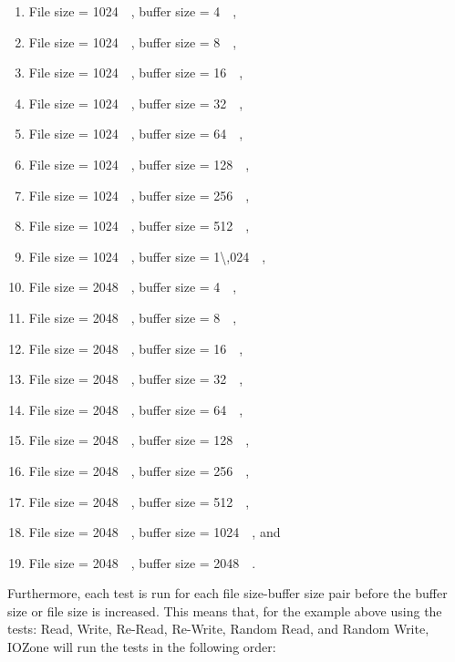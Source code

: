 \begin{enumerate}
	\item File size = \SI{1024}{\kilo\byte}, buffer size = \SI{4}{\kilo\byte},
	\item File size = \SI{1024}{\kilo\byte}, buffer size = \SI{8}{\kilo\byte},
	\item File size = \SI{1024}{\kilo\byte}, buffer size = \SI{16}{\kilo\byte},
	\item File size = \SI{1024}{\kilo\byte}, buffer size = \SI{32}{\kilo\byte},
	\item File size = \SI{1024}{\kilo\byte}, buffer size = \SI{64}{\kilo\byte},
	\item File size = \SI{1024}{\kilo\byte}, buffer size = \SI{128}{\kilo\byte},
	\item File size = \SI{1024}{\kilo\byte}, buffer size = \SI{256}{\kilo\byte},
	\item File size = \SI{1024}{\kilo\byte}, buffer size = \SI{512}{\kilo\byte},
	\item File size = \SI{1024}{\kilo\byte}, buffer size = \SI{1\,024}{\kilo\byte},
	\item File size = \SI{2048}{\kilo\byte}, buffer size = \SI{4}{\kilo\byte},
	\item File size = \SI{2048}{\kilo\byte}, buffer size = \SI{8}{\kilo\byte},
	\item File size = \SI{2048}{\kilo\byte}, buffer size = \SI{16}{\kilo\byte},
	\item File size = \SI{2048}{\kilo\byte}, buffer size = \SI{32}{\kilo\byte},
	\item File size = \SI{2048}{\kilo\byte}, buffer size = \SI{64}{\kilo\byte},
	\item File size = \SI{2048}{\kilo\byte}, buffer size = \SI{128}{\kilo\byte},
	\item File size = \SI{2048}{\kilo\byte}, buffer size = \SI{256}{\kilo\byte},
	\item File size = \SI{2048}{\kilo\byte}, buffer size = \SI{512}{\kilo\byte},
	\item File size = \SI{2048}{\kilo\byte}, buffer size = \SI{1024}{\kilo\byte}, and
	\item File size = \SI{2048}{\kilo\byte}, buffer size = \SI{2048}{\kilo\byte}.
\end{enumerate}
Furthermore, each test is run for each file size-buffer size pair before the buffer size or file size is increased. This means that, for the example above using the tests: Read, Write, Re-Read, Re-Write, Random Read, and Random Write, IOZone will run the tests in the following order:

